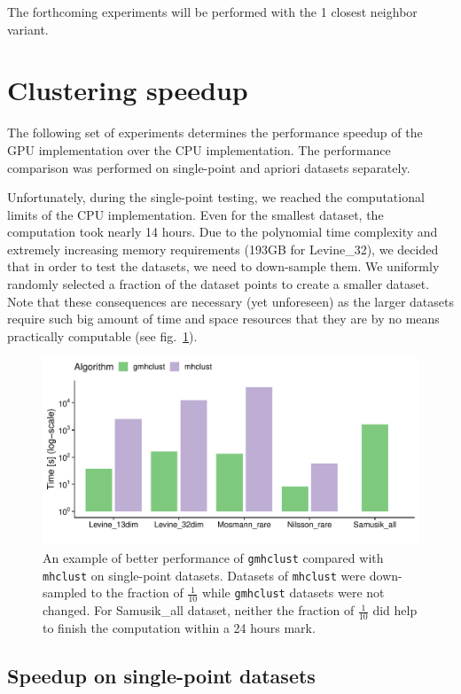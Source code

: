 The forthcoming experiments will be performed with the 1 closest neighbor variant.

\section{Clustering speedup}

The following set of experiments determines the performance speedup of the GPU implementation over the CPU implementation. The performance comparison was performed on single-point and apriori datasets separately.

Unfortunately, during the single-point testing, we reached the computational limits of the CPU implementation. Even for the smallest dataset, the computation took nearly 14 hours. Due to the polynomial time complexity and extremely increasing memory requirements (193GB for Levine\_32), we decided that in order to test the datasets, we need to down-sample them. We uniformly randomly selected a fraction of the dataset points to create a smaller dataset. Note that these consequences are necessary (yet unforeseen) as the larger datasets require such big amount of time and space resources that they are by no means practically computable (see fig.~\ref{fig04:fract_comp}).

\begin{figure}\centering
	\includegraphics[width=\linewidth]{img/mixed_perf_comp}
	\caption{An example of better performance of \texttt{gmhclust} compared with \texttt{mhclust} on single-point datasets. Datasets of \texttt{mhclust} were down-sampled to the fraction of $\frac{1}{10}$ while \texttt{gmhclust} datasets were not changed. For Samusik\_all dataset, neither the fraction of $\frac{1}{10}$ did help to finish the computation within a 24 hours mark.}
	\label{fig04:fract_comp}
\end{figure}

\subsection{Speedup on single-point datasets}

